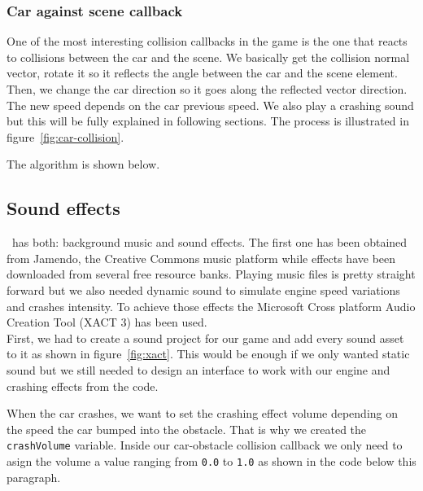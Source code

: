 \subsubsection{Car against scene callback}

One of the most interesting collision callbacks in the game is the one that reacts to 
collisions between the car and the scene. We basically get the collision normal vector,
rotate it so it reflects the angle between the car and the scene element. Then, we change the
car direction so it goes along the reflected vector direction. The new speed depends on the
car previous speed. We also play a crashing sound but this will be fully explained in following
sections. The process is illustrated in figure~\ref{fig:car-collision}.


The algorithm is shown below.\\



\subsection{Sound effects}
 
\game\ has both: background music and sound effects. The first one has been obtained from
Jamendo, the Creative Commons \cite{website:cc} music platform while effects have been
downloaded from several free resource banks. Playing music files is pretty straight forward
but we also needed dynamic sound to simulate engine speed variations and crashes intensity.
To achieve those effects the Microsoft Cross platform Audio Creation Tool (XACT 3) has
been used.\\

First, we had to create a sound project for our game and add every sound asset to it as
shown in figure~\ref{fig:xact}. This would be enough if we only wanted static sound but we
still needed to design an interface to work with our engine and crashing effects from the
code.\\


When the car crashes, we want to set the crashing effect volume depending on the speed
the car bumped into the obstacle. That is why we created the \texttt{crashVolume} variable.
Inside our car-obstacle collision callback we only need to asign the volume a value ranging
from \texttt{0.0} to \texttt{1.0} as shown in the code below this paragraph.

